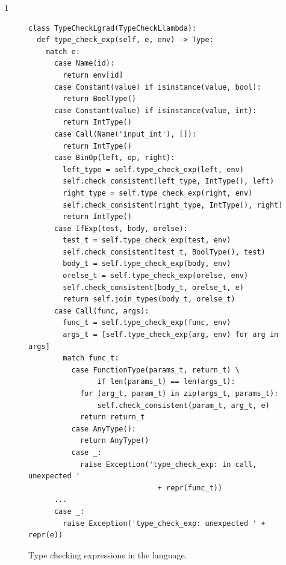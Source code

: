 \documentclass[7x10]{TimesAPriori_MIT}%
\def\pythonEd{1}
\def\edition{1}
\newcommand{\pythonColor}[0]{}
\numberwithin{theorem}{chapter}
\numberwithin{definition}{chapter}
\numberwithin{equation}{chapter}
\begin{document}
{\if\edition\pythonEd\pythonColor        
\begin{figure}[tbp]
\begin{tcolorbox}[colback=white]  
\begin{lstlisting}
class TypeCheckLgrad(TypeCheckLlambda):
  def type_check_exp(self, e, env) -> Type:
    match e:
      case Name(id):
        return env[id]
      case Constant(value) if isinstance(value, bool):
        return BoolType()
      case Constant(value) if isinstance(value, int):
        return IntType()
      case Call(Name('input_int'), []):
        return IntType()
      case BinOp(left, op, right):
        left_type = self.type_check_exp(left, env)
        self.check_consistent(left_type, IntType(), left)
        right_type = self.type_check_exp(right, env)
        self.check_consistent(right_type, IntType(), right)
        return IntType()
      case IfExp(test, body, orelse):
        test_t = self.type_check_exp(test, env)
        self.check_consistent(test_t, BoolType(), test)
        body_t = self.type_check_exp(body, env)
        orelse_t = self.type_check_exp(orelse, env)
        self.check_consistent(body_t, orelse_t, e)
        return self.join_types(body_t, orelse_t)
      case Call(func, args):
        func_t = self.type_check_exp(func, env)
        args_t = [self.type_check_exp(arg, env) for arg in args]
        match func_t:
          case FunctionType(params_t, return_t) \
                if len(params_t) == len(args_t):
            for (arg_t, param_t) in zip(args_t, params_t):
                self.check_consistent(param_t, arg_t, e)
            return return_t
          case AnyType():
            return AnyType()
          case _:
            raise Exception('type_check_exp: in call, unexpected '
                              + repr(func_t))
      ...
      case _:
        raise Exception('type_check_exp: unexpected ' + repr(e))
\end{lstlisting}
\end{tcolorbox}

\caption{Type checking expressions in the \LangGrad{} language.}
\label{fig:type-check-Lgradual-1}
\end{figure}

}
\end{document}
